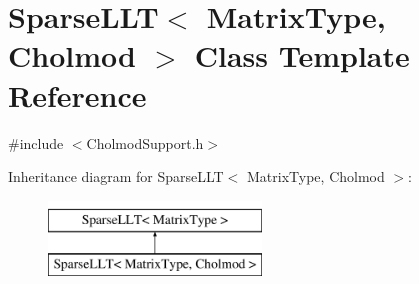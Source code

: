 \hypertarget{class_sparse_l_l_t_3_01_matrix_type_00_01_cholmod_01_4}{\section{Sparse\-L\-L\-T$<$ Matrix\-Type, Cholmod $>$ Class Template Reference}
\label{class_sparse_l_l_t_3_01_matrix_type_00_01_cholmod_01_4}
}


{\ttfamily \#include $<$Cholmod\-Support.\-h$>$}

Inheritance diagram for Sparse\-L\-L\-T$<$ Matrix\-Type, Cholmod $>$\-:\begin{figure}[H]
\begin{center}
\leavevmode
\includegraphics[height=2.000000cm]{class_sparse_l_l_t_3_01_matrix_type_00_01_cholmod_01_4}
\end{center}
\end{figure}
